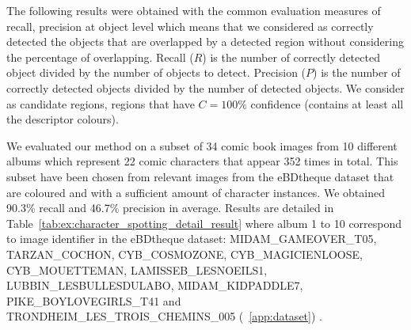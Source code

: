 The following results were obtained with the common evaluation measures of recall, precision at object level which means that we considered as correctly detected the objects that are overlapped by a detected region without considering the percentage of overlapping.
Recall ($R$) is the number of correctly detected object divided by the number of objects to detect.
Precision ($P$) is the number of correctly detected objects divided by the number of detected objects.
We consider as candidate regions, regions that have $C=100\%$ confidence (contains at least all the descriptor colours).%

We evaluated our method on a subset of 34 comic book images from 10 different albums which represent 22 comic characters that appear 352 times in total.
This subset have been chosen from relevant images from the eBDtheque dataset that are coloured and with a sufficient amount of character instances. 
We obtained 90.3\% recall and 46.7\% precision in average.
Results are detailed in Table~\ref{tab:ex:character_spotting_detail_result} where album 1 to 10 correspond to image identifier in the eBDtheque dataset: MIDAM\_GAMEOVER\_T05, TARZAN\_COCHON, CYB\_COSMOZONE, CYB\_MAGICIENLOOSE, CYB\_MOUETTEMAN, LAMISSEB\_LESNOEILS1, LUBBIN\_LESBULLESDULABO, MIDAM\_KIDPADDLE7, PIKE\_BOYLOVEGIRLS\_T41 and TRONDHEIM\_LES\_TROIS\_CHEMINS\_005 (~\ref{app:dataset}) .


